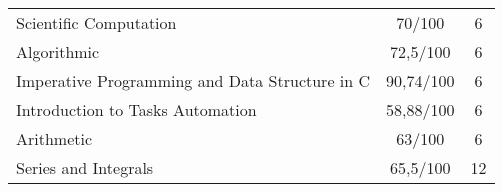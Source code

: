 \documentclass[a4paper,10pt]{article} %
\begin{document}
\begin{center}
\begin{tabular}{lcc}
Scientific Computation                                     &    70/100 & 6     \\
Algorithmic                                                &  72,5/100 & 6     \\
\hline
Imperative Programming and Data Structure in C             & 90,74/100 & 6     \\
Introduction to Tasks Automation                           & 58,88/100 & 6     \\
Arithmetic                                                 &    63/100 & 6     \\
Series and Integrals                                       &  65,5/100 & 12    \\
\hline
\end{tabular}
\end{center}

\end{document}

